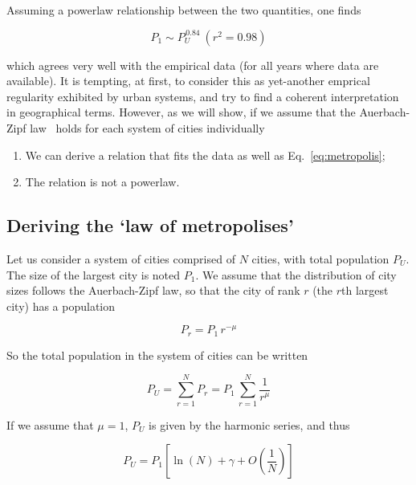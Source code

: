 Assuming a powerlaw relationship between the two quantities, one finds

\begin{equation}
    P_1 \sim P_U^{\,0.84}\:(r^2=0.98)
    \label{eq:metropolis}
\end{equation}

which agrees very well with the empirical data (for all years where data are
available). It is tempting, at first, to consider this as yet-another emprical
regularity exhibited by urban systems, and try to find a coherent interpretation
in geographical terms. However, as we will show, if we assume that the Auerbach-Zipf
law~\cite{Auerbach:1913,Zipf:1949} holds for each system of cities
individually

\begin{enumerate}
    \item We can derive a relation that fits the data as well as
        Eq.~\ref{eq:metropolis};
    \item The relation is not a powerlaw.
\end{enumerate}



\subsection{Deriving the `law of metropolises'}
\label{sub:deriving_the_law_of_metropolises_}

Let us consider a system of cities comprised of $N$ cities, with total
population $P_U$. The size of the largest city is noted $P_1$. We assume that
the distribution of city sizes follows the Auerbach-Zipf law, so that the city
of rank $r$ (the $r$th largest city) has a population

\begin{equation*}
    P_r = P_1\,r^{-\mu}
\end{equation*}

So the total population in the system of cities can be written

\begin{equation}
    P_U = \sum_{r=1}^N P_r = P_1\,\sum_{r=1}^{N} \frac{1}{r^\mu}
\end{equation}

If we assume that $\mu=1$, $P_U$ is given by the harmonic series, and thus

\begin{equation}
    P_U = P_1 \left[ \ln(N) + \gamma + O\left(\frac{1}{N}\right)\right]
\end{equation}

